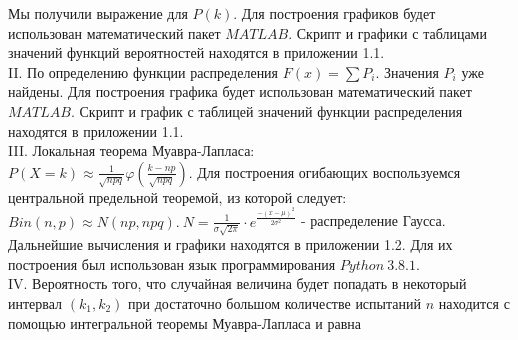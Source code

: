 \documentclass{article}
\begin{document}
Мы получили выражение для \begin{math}P(k)\end{math}. Для построения графиков будет использован математический пакет \begin{math}MATLAB\end{math}. Скрипт и графики с таблицами значений функций вероятностей находятся в приложении 1.1.
\vspace{\baselineskip}
\\
II. По определению функции распределения \begin{math}F(x) = \sum P_i\end{math}. Значения \begin{math}P_i\end{math} уже найдены. Для построения графика будет использован математический пакет \begin{math}MATLAB\end{math}. Скрипт и график с таблицей значений функции распределения находятся в приложении 1.1.
\vspace{\baselineskip}
\\
III. Локальная теорема Муавра-Лапласа:
\vspace{\baselineskip}
\\
\begin{math}
P(X=k)  \approx \displaystyle\frac{1}{\sqrt{npq}} \varphi \left(  \displaystyle\frac{k-np}{\sqrt{npq}} \right)
\end{math}. Для построения огибающих воспользуемся центральной предельной теоремой, из которой следует: \begin{math}
Bin(n, p) \approx N(np, npq).  \ N = \displaystyle\frac{1}{\sigma \sqrt{2 \pi}}\cdot e^\frac{-(x - \mu)^2}{2\sigma^2}
\end{math} - распределение Гаусса.
\vspace{\baselineskip}
\\Дальнейшие вычисления и графики находятся в приложении 1.2. Для их построения был использован язык программирования \begin{math}
 Python \ 3.8.1
\end{math}. 
\vspace{\baselineskip}
\\
IV. Вероятность того, что случайная величина будет попадать в некоторый интервал \begin{math}
\left( k_1, k_2 \right)
\end{math} при достаточно большом количестве испытаний \begin{math} n \end{math} находится с помощью интегральной теоремы Муавра-Лапласа и равна
\end{document}
